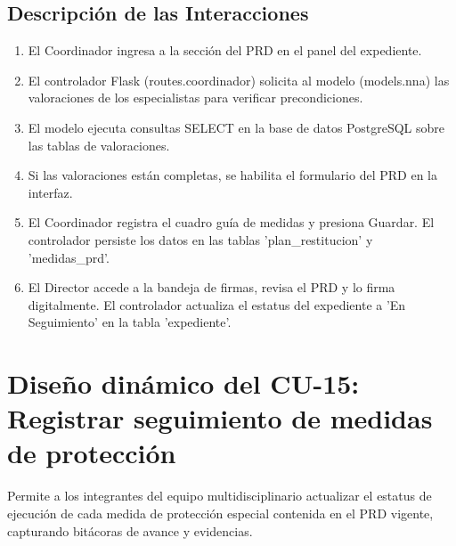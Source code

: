 \subsection{Descripción de las Interacciones}
\begin{enumerate}
    \item El Coordinador ingresa a la sección del PRD en el panel del expediente.
    \item El controlador Flask (routes.coordinador) solicita al modelo (models.nna) las valoraciones de los especialistas para verificar precondiciones.
    \item El modelo ejecuta consultas SELECT en la base de datos PostgreSQL sobre las tablas de valoraciones.
    \item Si las valoraciones están completas, se habilita el formulario del PRD en la interfaz.
    \item El Coordinador registra el cuadro guía de medidas y presiona Guardar. El controlador persiste los datos en las tablas 'plan\_restitucion' y 'medidas\_prd'.
    \item El Director accede a la bandeja de firmas, revisa el PRD y lo firma digitalmente. El controlador actualiza el estatus del expediente a 'En Seguimiento' en la tabla 'expediente'.
\end{enumerate}

\cleardoublepage
\section{Diseño dinámico del CU-15: Registrar seguimiento de medidas de protección}
\label{sec:disenoDinamicoCU15}

Permite a los integrantes del equipo multidisciplinario actualizar el estatus de ejecución de cada medida de protección especial contenida en el PRD vigente, capturando bitácoras de avance y evidencias.

